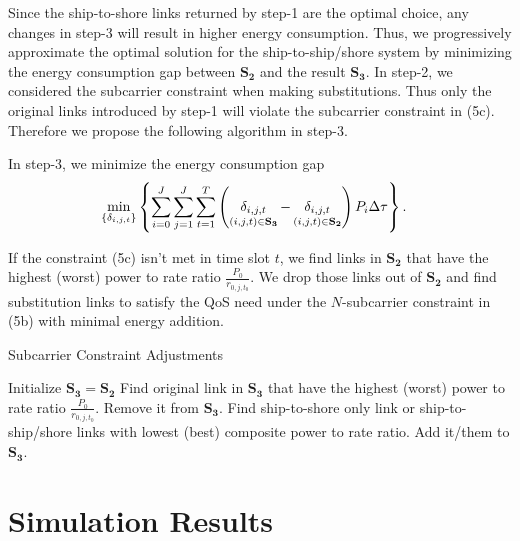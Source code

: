 \documentclass[conference]{IEEEtran}
\begin{document}
 Since the ship-to-shore links returned by step-1 are the optimal choice, any changes in step-3 will result in higher energy consumption. Thus, we progressively approximate the optimal solution for the ship-to-ship/shore system by minimizing the energy consumption gap between ${{\mathbf{S}}_{\mathbf{2}}}$ and the result ${{\mathbf{S}}_{\mathbf{3}}}$. 
 In step-2, we considered the subcarrier constraint when making substitutions. Thus only the original links introduced by step-1 will violate the subcarrier constraint in (5c). Therefore we propose the following algorithm in step-3.
 
 In step-3, we minimize the energy consumption gap 
 \begin{align}
   &\mathop {\min }\limits_{\left\{ {{\delta _{i,j,t}}} \right\}} \left\{ {\sum\limits_{i = 0}^J {\sum\limits_{j = 1}^J {\sum\limits_{t = 1}^T {\left( {\mathop {{\delta _{i,j,t}}}\limits_{\left( {i,j,t} \right) \in {{\bf{S}}_{\bf{3}}}}  - \mathop {{\delta _{i,j,t}}}\limits_{\left( {i,j,t} \right) \in {{\bf{S}}_{\bf{2}}}} } \right){P_i}\Delta \tau } } } } \right\}.
 \end{align}
 

 If the constraint (5c) isn't met in time slot ${t}$, we find links in ${{\mathbf{S}}_{\mathbf{2}}}$ that have the highest (worst) power to rate ratio ${\frac{P_0}{r_{0,j,{t_0}}}}$. We drop those links out of ${{\mathbf{S}}_{\mathbf{2}}}$ and find substitution links to satisfy the QoS need under the $N$-subcarrier constraint in (5b) with minimal energy addition. 
 
 \begin{algorithm}[ht]
 \caption{Subcarrier Constraint Adjustments}
 \begin{algorithmic}[1]
 \STATE Initialize ${{\mathbf{S}}_{\mathbf{3}}}={{\mathbf{S}}_{\mathbf{2}}}$
   \STATE Find original link in ${{\mathbf{S}}_{\mathbf{3}}}$ that have the highest (worst) power to rate ratio ${\frac{P_0}{r_{0,j,{t_0}}}}$. 
   \STATE Remove it from ${{\mathbf{S}}_{\mathbf{3}}}$.
    \STATE Find ship-to-shore only link or ship-to-ship/shore links with lowest (best) composite power to rate ratio. 
    \STATE Add it/them to ${{\mathbf{S}}_{\mathbf{3}}}$.
   \ENDWHILE
  \ENDIF
 \ENDFOR
 \end{algorithmic}
 \end{algorithm}
 
 
 \section{Simulation Results}\label{sec:4}
 
\end{document}
